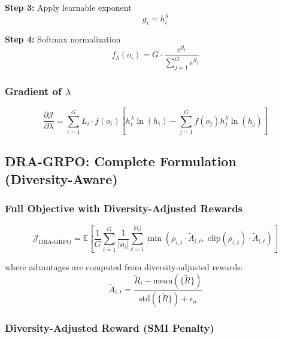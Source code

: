 \documentclass[11pt,a4paper]{article}
\begin{document}
\textbf{Step 3:} Apply learnable exponent
\begin{equation}
g_i = h_i^\lambda
\end{equation}

\textbf{Step 4:} Softmax normalization
\begin{equation}
f_\lambda(o_i) = G \cdot \frac{e^{g_i}}{\sum_{j=1}^G e^{g_j}}
\end{equation}

\subsubsection{Gradient of $\lambda$}

\begin{equation}
\frac{\partial \mathcal{J}}{\partial \lambda} = \sum_{i=1}^{G} L_i \cdot f(o_i) \left[ h_i^\lambda \ln(h_i) - \sum_{j=1}^{G} f(o_j) h_j^\lambda \ln(h_j) \right]
\end{equation}

\subsection{DRA-GRPO: Complete Formulation (Diversity-Aware)}

\subsubsection{Full Objective with Diversity-Adjusted Rewards}

\begin{equation}
\mathcal{J}_{\text{DRA-GRPO}} = \mathbb{E} \left[ \frac{1}{G} \sum_{i=1}^{G} \frac{1}{|o_i|} \sum_{t=1}^{|o_i|} \min\left( \rho_{i,t} \cdot \tilde{A}_{i,t}, \; \text{clip}(\rho_{i,t}) \cdot \tilde{A}_{i,t} \right) \right]
\end{equation}

where advantages are computed from diversity-adjusted rewards:
\begin{equation}
\tilde{A}_{i,t} = \frac{\tilde{R}_i - \text{mean}(\{\tilde{R}\})}{\text{std}(\{\tilde{R}\}) + \epsilon_\sigma}
\end{equation}

\subsubsection{Diversity-Adjusted Reward (SMI Penalty)}
\end{document}
